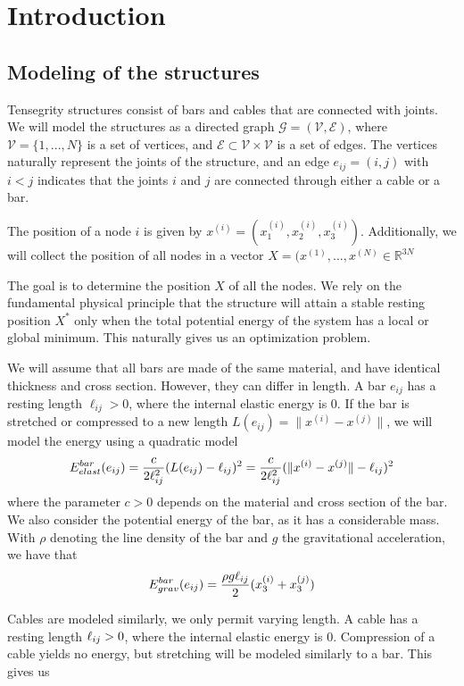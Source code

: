 \section{Introduction}
\subsection{Modeling of the structures}
Tensegrity structures consist of bars and cables that are connected with joints. We will model the structures as a directed graph $\mathcal{G} = (\mathcal{V},\mathcal{E})$, where $\mathcal{V} = \{1,...,N\}$ is a set of vertices, and $\mathcal{E} \subset \mathcal{V} \times \mathcal{V}$ is a set of edges. The vertices naturally represent the joints of the structure, and an edge $e_{ij} = (i,j)$ with $i < j$ indicates that the joints $i$ and $j$ are connected through either a cable or a bar.

The position of a node $i$ is given by $x^{(i)} = (x_1^{(i)},x_2^{(i)},x_3^{(i)})$. Additionally, we will collect the position of all nodes in a vector $X = (x^{(1)},...,x^{(N)} \in \mathbb{R}^{3N}$

The goal is to determine the position $X$ of all the nodes. We rely on the fundamental physical principle that the structure will attain a stable resting position $X^*$ only when the total potential energy of the system has a local or global minimum. This naturally gives us an optimization problem.

We will assume that all bars are made of the same material, and have identical thickness and cross section. However, they can differ in length. A bar $e_{ij}$ has a resting length $\ell_{ij}>0$, where the internal elastic energy is $0$. If the bar is stretched or compressed to a new length $L(e_{ij})=\lVert x^{(i)} - x^{(j)}\rVert$, we will model the energy using a quadratic model
\begin{equation}
    E^{bar}_{elast}(e_{ij}) = \frac{c}{2\ell_{ij}^2}(L(e_{ij}) - \ell_{ij})^2 = \frac{c}{2 \ell_{ij}^2}(\lVert x^{(i)} - x^{(j)}\rVert - \ell_{ij})^2
    \label{barElast}
\end{equation}
where the parameter $c > 0$ depends on the material and cross section of the bar. We also consider the potential energy of the bar, as it has a considerable mass. With $\rho$ denoting the line density of the bar and $g$ the gravitational acceleration, we have that
\begin{equation}
    E^{bar}_{grav}(e_{ij}) = \frac{\rho g \ell_{ij}}{2}(x_3^{(i)}+x_3^{(j)})
    \label{barGrav}
\end{equation}

Cables are modeled similarly, we only permit varying length. A cable has a resting length $\ell_{ij} > 0$, where the internal elastic energy is $0$. Compression of a cable yields no energy, but stretching will be modeled similarly to a bar. This gives us

